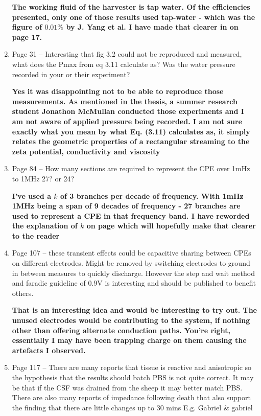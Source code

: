 \begin{enumerate}
    \textbf{\textcolor{OliveGreen}{
      The working fluid of the harvester is tap water.
      Of the efficiencies presented, only one of those results used tap-water - which was the figure of $0.01\%$ by J. Yang et al.
      I have made that clearer in on page 17.
    }}

  \item Page 31 -- Interesting that fig 3.2 could not be reproduced and measured, what does the Pmax from eq 3.11 calculate as? Was the water pressure recorded in your or their experiment?

    \textbf{\textcolor{OliveGreen}{
      Yes it was disappointing not to be able to reproduce those measurements.
      As mentioned in the thesis, a summer research student Jonathon McMullan conducted those experiments and I am not aware of applied pressure being recorded.
      I am not sure exactly what you mean by what Eq. (3.11) calculates as, it simply relates the geometric properties of a rectangular streaming to the zeta potential, conductivity and viscosity
    }}

  \item Page 84 -- How many sections are required to represent the CPE over  1mHz to 1MHz 27? or 24?

    \textbf{\textcolor{OliveGreen}{
      I've used a $k$ of 3 branches per decade of frequency.
      With 1mHz--1MHz being a span of 9 decades of frequency - 27 branches are used to represent a CPE in that frequency band.
      I have reworded the explanation of $k$ on page \pageref{edit:alistair1} which will hopefully make that clearer to the reader
    }}

  \item Page 107 -- these transient effects could be capacitive sharing between CPEs on different electrodes. Might be removed by switching electrodes to ground in between measures to quickly discharge. However the step and wait method and faradic guideline of 0.9V is interesting and should be published to benefit others.

    \textbf{\textcolor{OliveGreen}{
      That is an interesting idea and would be interesting to try out.
      The unused electrodes would be contributing to the system, if nothing other than offering alternate conduction paths.
      You're right, essentially I may have been trapping charge on them causing the artefacts I observed.
    }}

  \item Page 117 -- There are many reports that tissue is reactive and anisotropic so the hypothesis that the results should batch PBS is not quite correct. It may be that if the CSF was drained from the sheep it may better match PBS. There are also many reports of impedance following death that also support the finding that there are little changes up to 30 mins E.g. Gabriel \& gabriel


\end{enumerate}
